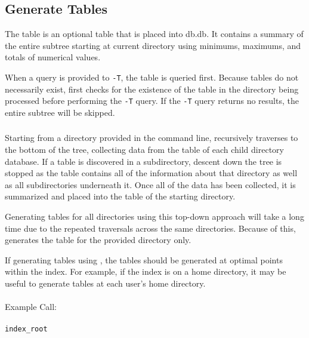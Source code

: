 \subsection{Generate \treesummary Tables}
\label{sec:treesummary}
The \treesummary table is an optional table that is placed into
db.db. It contains a summary of the entire subtree starting at current
directory using minimums, maximums, and totals of numerical values.

When a query is provided to \gufiquery \texttt{-T}, the \treesummary
table is queried first. Because \treesummary tables do not necessarily
exist, \gufiquery first checks for the existence of the \treesummary
table in the directory being processed before performing the
\texttt{-T} query. If the \texttt{-T} query returns no results, the
entire subtree will be skipped.

\subsubsection{\gufitreesummary}
Starting from a directory provided in the command line,
\gufitreesummary recursively traverses to the bottom of the tree,
collecting data from the \summary table of each child directory
database. If a \treesummary table is discovered in a subdirectory,
descent down the tree is stopped as the \treesummary table contains
all of the information about that directory as well as all
subdirectories underneath it. Once all of the data has been collected,
it is summarized and placed into the \treesummary table of the
starting directory.

Generating \treesummary tables for all directories using this top-down
approach will take a long time due to the repeated traversals across
the same directories. Because of this, \gufitreesummary generates the
\treesummary table for the provided directory only.

If generating \treesummary tables using \gufitreesummary, the tables
should be generated at optimal points within the index. For example,
if the index is on a home directory, it may be useful to generate
\treesummary tables at each user's home directory.
\\\\
Example Call:
\\\\
\indent \gufitreesummary \texttt{index\_root}

